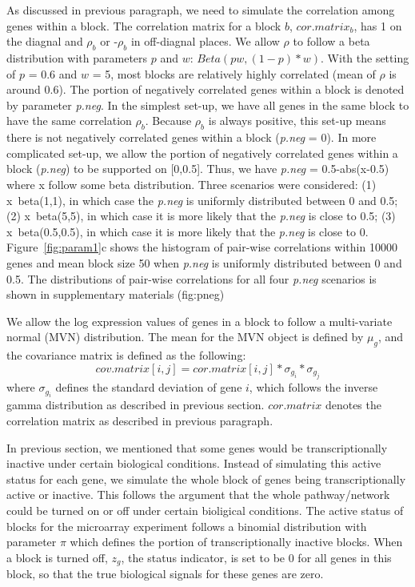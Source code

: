 \documentclass[11pt]{article}
\begin{document}
As discussed in previous paragraph, we need to simulate the
correlation among genes within a block. The correlation matrix for a
block $b$, $cor.matrix_b$, has 1 on the diagnal and $\rho_b$ or
-$\rho_b$ in off-diagnal places. We allow $\rho$ to follow a beta
distribution with parameters $p$ and $w$: $Beta(pw,(1-p)*w)$. With the
setting of $p$ = 0.6 and $w$ = 5, most blocks are relatively highly
correlated (mean of $\rho$ is around 0.6). The portion of negatively
correlated genes within a block is denoted by parameter
\textit{p.neg}. In the simplest set-up, we have all genes in the same
block to have the same correlation $\rho_b$. Because $\rho_b$ is
always positive, this set-up means there is not negatively correlated
genes within a block (\textit{p.neg} = 0). In more complicated set-up,
we allow the portion of negatively correlated genes within a block
(\textit{p.neg}) to be supported on [0,0.5]. Thus, we have
\textit{p.neg} = 0.5-abs(x-0.5) where x follow some beta
distribution. Three scenarios were considered: (1) x~beta(1,1), in
which case the \textit{p.neg} is uniformly distributed between 0 and
0.5; (2) x~beta(5,5), in which case it is more likely that the
\textit{p.neg} is close to 0.5; (3) x~beta(0.5,0.5), in which case it
is more likely that the \textit{p.neg} is close to
0. Figure~\ref{fig:param1}c shows the histogram of pair-wise
correlations within 10000 genes and mean block size 50 when
\textit{p.neg} is uniformly distributed between 0 and 0.5. The
distributions of pair-wise correlations for all four \textit{p.neg}
scenarios is shown in supplementary materials (fig:pneg)

We allow the log expression values of genes in a block to follow a
multi-variate normal (MVN) distribution. The mean for the MVN object
is defined by $\mu_g$, and the covariance matrix is defined as the
following: 
\[cov.matrix[i,j] = cor.matrix[i,j] * \sigma_{g_i} * \sigma_{g_j}\]
where $\sigma_{g_i}$ defines the standard deviation of gene $i$, which
follows the inverse gamma distribution as described in previous
section. $cor.matrix$ denotes the correlation matrix as described in
previous paragraph.

In previous section, we mentioned that some genes would be
transcriptionally inactive under certain biological
conditions. Instead of simulating this active status for each gene, we
simulate the whole block of genes being transcriptionally active or
inactive. This follows the argument that the whole pathway/network
could be turned on or off under certain bioligical conditions. The
active status of blocks for the microarray experiment follows a
binomial distribution with parameter $\pi$ which defines the portion
of transcriptionally inactive blocks. When a block is turned off,
$z_g$, the status indicator, is set to be 0 for all genes in this
block, so that the true biological signals for these genes are zero. 
\end{document}
